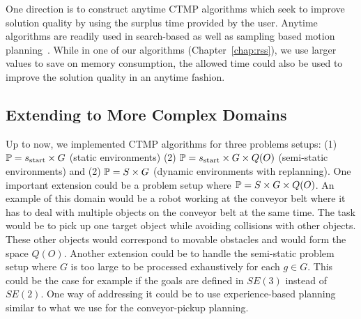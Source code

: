 \documentclass[a4paper]{report}
\begin{document}
One direction is to construct anytime CTMP algorithms which seek to improve solution quality by using the surplus \Tbound time provided by the user. Anytime algorithms are readily used in search-based as well as sampling based motion planning~\cite{likhachev2004ara,karaman2011sampling}. While in one of our algorithms (Chapter~\ref{chap:rss}), we use larger \Tbound values to save on memory consumption, the allowed time could also be used to improve the solution quality in an anytime fashion.

\subsection{Extending to More Complex Domains}
Up to now, we implemented CTMP algorithms for three problems setups: (1) $\mathbb{P} = s_{\textrm{start}} \times G$ (static environments) (2) $\mathbb{P} = s_{\textrm{start}} \times G \times Q(O)$ (semi-static environments) and (2) $\mathbb{P} = S \times G$ (dynamic environments with replanning). One important extension could be a problem setup where $\mathbb{P} = S \times G \times Q(O)$. An example of this domain would be a robot working at the conveyor belt where it has to deal with multiple objects on the conveyor belt at the same time. The task would be to pick up one target object while avoiding collisions with other objects. These other objects would correspond to movable obstacles and would form the space $Q(O)$.
Another extension could be to handle the semi-static problem setup where $G$ is too large to be processed exhaustively for each $g \in G$. This could be the case for example if the goals are defined in $SE(3)$ instead of $SE(2)$. One way of addressing it could be to use experience-based planning similar to what we use for the conveyor-pickup planning.

\
%
\end{document}
